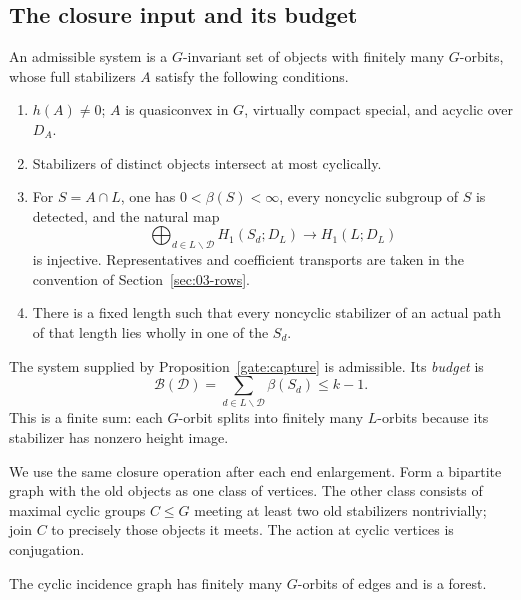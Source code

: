 \subsection{The closure input and its budget}
\begin{definition}\label{close:input}
An admissible system is a $G$-invariant set of objects with finitely many
$G$-orbits, whose full stabilizers $A$ satisfy the following conditions.
\begin{enumerate}
\item $h(A)\ne0$; $A$ is quasiconvex in $G$, virtually compact special,
and acyclic over $D_A$.
\item Stabilizers of distinct objects intersect at most cyclically.
\item For $S=A\cap L$, one has $0<\beta(S)<\infty$, every noncyclic
subgroup of $S$ is detected, and the natural map
\[
 \bigoplus_{d\in L\backslash\mathcal D}H_1(S_d;D_L)
       \longrightarrow H_1(L;D_L)
\]
is injective. Representatives and coefficient transports are taken in
the convention of Section~\ref{sec:03-rows}.
\item There is a fixed length such that every noncyclic stabilizer of
an actual path of that length lies wholly in one of the $S_d$.
\end{enumerate}
The system supplied by Proposition~\ref{gate:capture} is admissible.
Its \emph{budget} is
\[
 \mathcal B(\mathcal D)=
       \sum_{d\in L\backslash\mathcal D}\beta(S_d)\le k-1.
\]
This is a finite sum: each $G$-orbit splits into finitely many $L$-orbits
because its stabilizer has nonzero height image.
\end{definition}

We use the same closure operation after each end enlargement. Form a
bipartite graph with the old objects as one class of vertices. The
other class consists of maximal cyclic groups $C\le G$ meeting at
least two old stabilizers nontrivially; join $C$ to precisely those
objects it meets. The action at cyclic vertices is conjugation.

\begin{lemma}\label{close:join-forest}
The cyclic incidence graph has finitely many $G$-orbits of edges and is
a forest.
\end{lemma}

